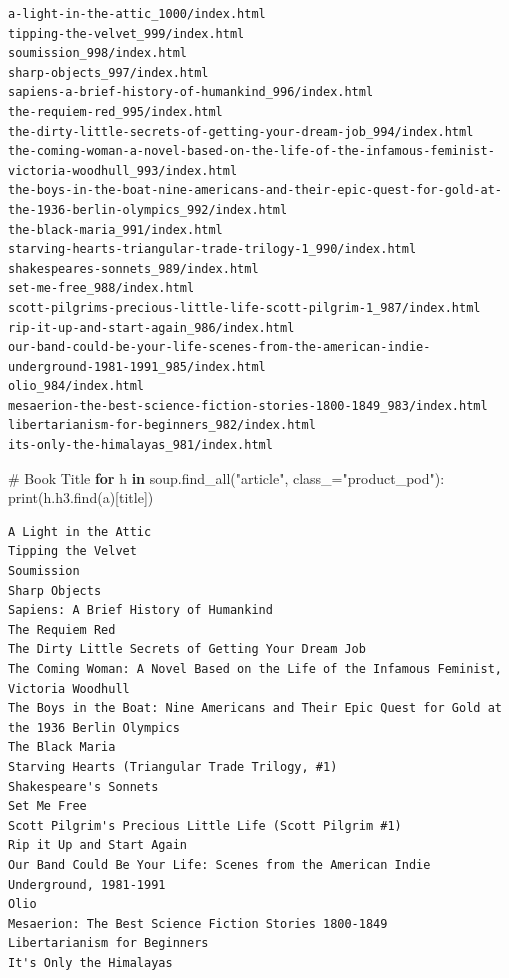 \documentclass[
  letterpaper,
  DIV=11,
  numbers=noendperiod]{scrreprt}
\newenvironment{Shaded}{\begin{snugshade}}{\end{snugshade}}
\newcommand{\BuiltInTok}[1]{\textcolor[rgb]{0.00,0.23,0.31}{#1}}
\newcommand{\CommentTok}[1]{\textcolor[rgb]{0.37,0.37,0.37}{#1}}
\newcommand{\ControlFlowTok}[1]{\textcolor[rgb]{0.00,0.23,0.31}{\textbf{#1}}}
\newcommand{\KeywordTok}[1]{\textcolor[rgb]{0.00,0.23,0.31}{\textbf{#1}}}
\newcommand{\NormalTok}[1]{\textcolor[rgb]{0.00,0.23,0.31}{#1}}
\newcommand{\OperatorTok}[1]{\textcolor[rgb]{0.37,0.37,0.37}{#1}}
\newcommand{\StringTok}[1]{\textcolor[rgb]{0.13,0.47,0.30}{#1}}
\begin{document}
\begin{verbatim}
a-light-in-the-attic_1000/index.html
tipping-the-velvet_999/index.html
soumission_998/index.html
sharp-objects_997/index.html
sapiens-a-brief-history-of-humankind_996/index.html
the-requiem-red_995/index.html
the-dirty-little-secrets-of-getting-your-dream-job_994/index.html
the-coming-woman-a-novel-based-on-the-life-of-the-infamous-feminist-victoria-woodhull_993/index.html
the-boys-in-the-boat-nine-americans-and-their-epic-quest-for-gold-at-the-1936-berlin-olympics_992/index.html
the-black-maria_991/index.html
starving-hearts-triangular-trade-trilogy-1_990/index.html
shakespeares-sonnets_989/index.html
set-me-free_988/index.html
scott-pilgrims-precious-little-life-scott-pilgrim-1_987/index.html
rip-it-up-and-start-again_986/index.html
our-band-could-be-your-life-scenes-from-the-american-indie-underground-1981-1991_985/index.html
olio_984/index.html
mesaerion-the-best-science-fiction-stories-1800-1849_983/index.html
libertarianism-for-beginners_982/index.html
its-only-the-himalayas_981/index.html
\end{verbatim}

\begin{Shaded}
\begin{Highlighting}[]
\CommentTok{\# Book Title }
\ControlFlowTok{for}\NormalTok{ h }\KeywordTok{in}\NormalTok{ soup.find\_all(}\StringTok{"article"}\NormalTok{, class\_}\OperatorTok{=}\StringTok{"product\_pod"}\NormalTok{):}
    \BuiltInTok{print}\NormalTok{(h.h3.find(}\StringTok{\textquotesingle{}a\textquotesingle{}}\NormalTok{)[}\StringTok{\textquotesingle{}title\textquotesingle{}}\NormalTok{])}
\end{Highlighting}
\end{Shaded}

\begin{verbatim}
A Light in the Attic
Tipping the Velvet
Soumission
Sharp Objects
Sapiens: A Brief History of Humankind
The Requiem Red
The Dirty Little Secrets of Getting Your Dream Job
The Coming Woman: A Novel Based on the Life of the Infamous Feminist, Victoria Woodhull
The Boys in the Boat: Nine Americans and Their Epic Quest for Gold at the 1936 Berlin Olympics
The Black Maria
Starving Hearts (Triangular Trade Trilogy, #1)
Shakespeare's Sonnets
Set Me Free
Scott Pilgrim's Precious Little Life (Scott Pilgrim #1)
Rip it Up and Start Again
Our Band Could Be Your Life: Scenes from the American Indie Underground, 1981-1991
Olio
Mesaerion: The Best Science Fiction Stories 1800-1849
Libertarianism for Beginners
It's Only the Himalayas
\end{verbatim}
\end{document}
